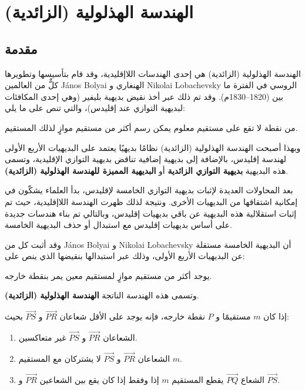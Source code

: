 
\chapter{الهندسة الهذلولية (الزائدية)}
\section[مقدمة]{مقدمة \cite{ref3}}

الهندسة الهذلولية (الزائدية) هي إحدى الهندسات اللاإقليدية، وقد قام بتأسيسها وتطويرها كلٌّ من العالمين János Bolyai الهنغاري و Nikolai Lobachevsky الروسي في الفترة ما بين (1820--1830م). وقد تم ذلك عبر أخذ نقيض بديهية بليفير (وهي إحدى المكافئات لبديهية التوازي عند إقليدس)، والتي تنص على ما يلي:

من نقطة لا تقع على مستقيم معلوم يمكن رسم أكثر من مستقيم موازٍ لذلك المستقيم.

وبهذا أصبحت الهندسة الهذلولية (الزائدية) نظامًا بديهيًا يعتمد على البديهيات الأربع الأولى لهندسة إقليدس، بالإضافة إلى بديهية إضافية تناقض بديهية التوازي الإقليدية، وتسمى هذه البديهية \textbf{بديهية التوازي الزائدية} أو \textbf{البديهية المميزة للهندسة الهذلولية (الزائدية)}.

بعد المحاولات العديدة لإثبات بديهية التوازي الخامسة لإقليدس، بدأ العلماء يشكّون في إمكانية اشتقاقها من البديهيات الأخرى. ونتيجة لذلك ظهرت الهندسة اللاإقليدية، حيث تم إثبات استقلالية هذه البديهية عن باقي بديهيات إقليدس، وبالتالي تم بناء هندسات جديدة على أساس بديهيات إقليدس مع استبدال أو حذف البديهية الخامسة.

وقد أثبت كل من János Bolyai و Nikolai Lobachevsky أن البديهية الخامسة مستقلة عن البديهيات الأربع الأولى، وذلك عبر استبدالها بنقيضها الذي ينص على:

يوجد أكثر من مستقيم موازٍ لمستقيم معين يمر بنقطة خارجه.

وتسمى هذه الهندسة الناتجة \textbf{الهندسة الهذلولية (الزائدية)}.

\begin{axiom}
	إذا كان $m$ مستقيمًا و $P$ نقطة خارجه، فإنه يوجد على الأقل شعاعان $\overrightarrow{PR}$ و $\overrightarrow{PS}$ بحيث:
	\begin{enumerate}
		\item الشعاعان $\overrightarrow{PR}$ و $\overrightarrow{PS}$ غير متعاكسين.
		\item الشعاعان $\overrightarrow{PR}$ و $\overrightarrow{PS}$ لا يشتركان مع المستقيم $m$.
		\item الشعاع $\overrightarrow{PQ}$ يقطع المستقيم $m$ إذا وفقط إذا كان يقع بين الشعاعين $\overrightarrow{PR}$ و $\overrightarrow{PS}$.
	\end{enumerate}
\end{axiom}

